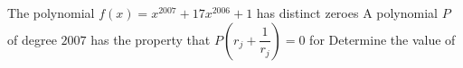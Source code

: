The polynomial $f(x)=x^{2007}+17x^{2006}+1$ has distinct zeroes   A polynomial $P$ of degree $2007$ has the property that $P\left(r_j+\dfrac{1}{r_j}\right)=0$ for   Determine the value of 